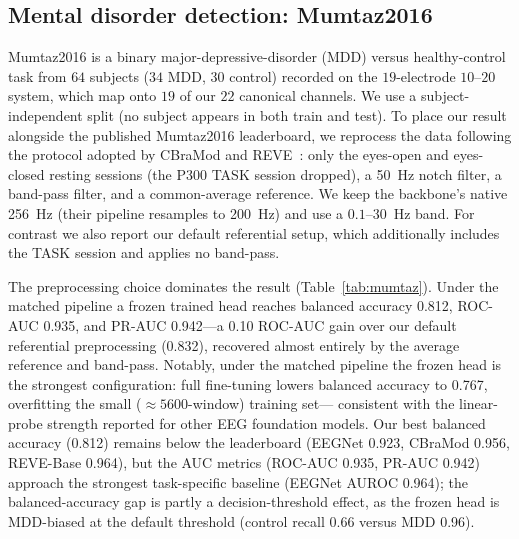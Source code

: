 \documentclass[journal]{IEEEtran}
\begin{document}
\subsection{Mental disorder detection: Mumtaz2016}
Mumtaz2016 is a binary major-depressive-disorder (MDD) versus healthy-control
task from $64$ subjects ($34$ MDD, $30$ control) recorded on the $19$-electrode
$10$--$20$ system, which map onto $19$ of our $22$ canonical channels. We use a
subject-independent split (no subject appears in both train and test). To place
our result alongside the published Mumtaz2016 leaderboard, we reprocess the data
following the protocol adopted by CBraMod and
REVE~\cite{wang2024cbramod,elouahidi2025reve}: only the eyes-open and eyes-closed
resting sessions (the P300 TASK session dropped), a \SI{50}{\hertz} notch filter,
a band-pass filter, and a common-average reference. We keep the backbone's native
\SI{256}{\hertz} (their pipeline resamples to \SI{200}{\hertz}) and use a
$0.1$--$30$~\si{\hertz} band. For contrast we also report our default referential
setup, which additionally includes the TASK session and applies no band-pass.

The preprocessing choice dominates the result (Table~\ref{tab:mumtaz}). Under the
matched pipeline a frozen trained head reaches balanced accuracy \num{0.812},
ROC-AUC \num{0.935}, and PR-AUC \num{0.942}---a \num{0.10} ROC-AUC gain over our
default referential preprocessing (\num{0.832}), recovered almost entirely by the
average reference and band-pass. Notably, under the matched pipeline the frozen
head is the strongest configuration: full fine-tuning lowers balanced accuracy to
\num{0.767}, overfitting the small ($\approx\!\num{5600}$-window) training set---
consistent with the linear-probe strength reported for other EEG foundation
models. Our best balanced accuracy (\num{0.812}) remains below the leaderboard
(EEGNet \num{0.923}, CBraMod \num{0.956}, REVE-Base \num{0.964}), but the AUC
metrics (ROC-AUC \num{0.935}, PR-AUC \num{0.942}) approach the strongest
task-specific baseline (EEGNet AUROC \num{0.964}); the balanced-accuracy gap is
partly a decision-threshold effect, as the frozen head is MDD-biased at the
default threshold (control recall \num{0.66} versus MDD \num{0.96}).
\end{document}
